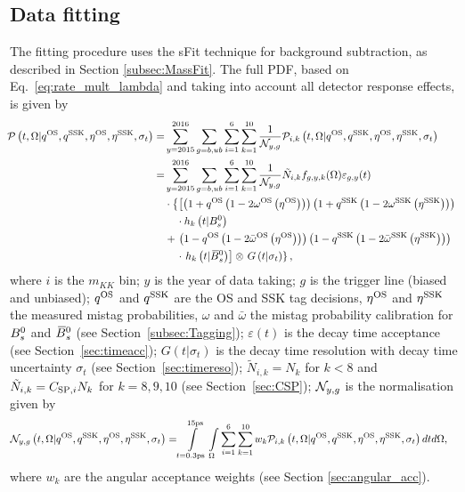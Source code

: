 \subsection{Data fitting}
The fitting procedure uses the sFit technique for background subtraction, as described in Section \ref{subsec:MassFit}.
The full PDF, based on Eq.~\eqref{eq:rate_mult_lambda} and taking into account all detector response effects, is given by
\small{
\begin{align}
 \!\!{\cal P}\left( t,\Omega| q^{\rm OS},  q^{\rm SSK}, \eta^{\rm OS}, \eta^{\rm SSK}, \sigma_{t} \right) = & 
 \sum_{y=2015}^{2016}\sum_{g=b,ub}\sum_{i=1}^{6}\sum_{k=1}^{10}\frac{1}{{\cal N}_{y,g}}{\cal P}_{i,k}\left( t,\Omega| q^{\rm OS},  q^{\rm SSK}, \eta^{\rm OS}, \eta^{\rm SSK}, \sigma_{t} \right) \nonumber \\
 = & \sum_{y=2015}^{2016}\sum_{g=b,ub}\sum_{i=1}^{6}\sum_{k=1}^{10} \frac{1}{{\cal N}_{y,g}}\tilde{N}_{i,k} f_{g,y,k}(\Omega)\varepsilon_{g,y}(t) \nonumber \\
 & \cdot \left\{\left[\left( 1+q^{\rm OS}\left(1-2\omega^{\rm OS}\left(\eta^{\rm OS}\right)\right)\right)
 \left(1+q^{\rm SSK}\left(1-2\omega^{\rm SSK}\left(\eta^{\rm SSK}\right)\right)\right)\right . \right .\nonumber \\
 & \;\;\;\;\cdot h_k\left(t | B^0_s\right) \nonumber \\
 & +       \left .    \left(1-q^{\rm OS}\left(1-2\bar{\omega}^{\rm OS}\left(\eta^{\rm OS}\right)\right)\right)
\left(1-q^{\rm SSK}\left(1-2\bar{\omega}^{\rm SSK}\left(\eta^{\rm SSK}\right)\right)\right) \right.\nonumber \\
  & \;\;\;\;\cdot \left. h_k\left(t | \kern 0.18em\overline{\kern -0.18em B}{}^0_s\right) \right] \otimes \left. G\left(t | \sigma_{t}\right) \right\},
 \label{eq:fullpdf}
 \end{align}}
where $i$ is the $m_{KK}$ bin; $y$ is the year of data taking; $g$ is the trigger line (biased and unbiased); $q^{\rm OS}$ and $q^{\rm SSK}$ are the OS and SSK tag decisions, $\eta^{\rm OS}$ and $\eta^{\rm SSK}$ the measured mistag probabilities, $\omega$ and $\bar{\omega}$ the mistag probability calibration for
$B^0_s$ and $\kern 0.18em\overline{\kern -0.18em B}{}^0_s$ (see Section~\ref{subsec:Tagging}); $\varepsilon(t)$ is the decay time acceptance (see Section~\ref{sec:timeacc}); $G\left(t | \sigma_{t}\right)$ is the decay time resolution with
decay time uncertainty $\sigma_{t}$ (see Section~\ref{sec:timereso}); $\tilde{N}_{i,k} = N_{k}$ for $k<8$ and $\tilde{N}_{i,k} = C_{{\rm SP},i}N_{k}$ for $k=8,9,10$ (see Section~\ref{sec:CSP}); 
${\cal N}_{y,g}$ is the normalisation given by
\begin{align}
 {\cal N}_{y,g}\left( t,\Omega| q^{\rm OS},  q^{\rm SSK}, \eta^{\rm OS}, \eta^{\rm SSK}, \sigma_{t} \right) = & 
 \int\displaylimits_{t=0.3\text{ps}}^{15\text{ps}}\int\displaylimits_{\Omega} \sum_{i=1}^{6} \sum_{k=1}^{10}w_{k} {\cal P}_{i,k}
 \left( t,\Omega| q^{\rm OS},  q^{\rm SSK}, \eta^{\rm OS}, \eta^{\rm SSK}, \sigma_{t} \right) dt d\Omega,
\end{align}
where $w_{k}$ are the angular acceptance weights (see Section \ref{sec:angular_acc}).

